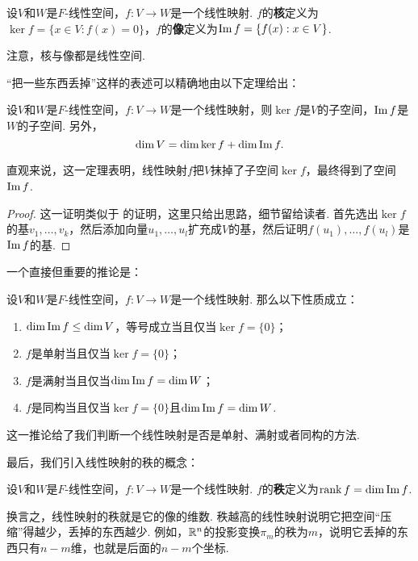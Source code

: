 \begin{definition}[核与像]\label{def:kernel-image}
设$V$和$W$是$F$-线性空间，$f:V\to W$是一个线性映射. $f$的\textbf{核}定义为$\ker f=\{x\in V:f(x)=0\}$，$f$的\textbf{像}定义为$\operatorname*{Im} f=\{f(x):x\in V\}$. 
\end{definition}
注意，核与像都是线性空间. 

“把一些东西丢掉”这样的表述可以精确地由以下定理给出：

\begin{theorem}\label{thm:kernel-image-property}
设$V$和$W$是$F$-线性空间，$f:V\to W$是一个线性映射，则$\ker f$是$V$的子空间，$\operatorname*{Im} f$是$W$的子空间. 另外，
\[\dim V=\dim\ker f+\dim\operatorname*{Im} f.\]
\end{theorem}
直观来说，这一定理表明，线性映射$f$把$V$抹掉了子空间$\ker f$，最终得到了空间$\operatorname*{Im} f$. 
\begin{proof}
这一证明类似于 的证明，这里只给出思路，细节留给读者. 首先选出$\ker f$的基$v_1,\dots,v_k$，然后添加向量$u_1,\dots,u_l$扩充成$V$的基，然后证明$f(u_1),\dots,f(u_l)$是$\operatorname*{Im} f$的基. 
\end{proof}

一个直接但重要的推论是：
\begin{corollary}\label{cor:kernel-image-isomorphism}
设$V$和$W$是$F$-线性空间，$f:V\to W$是一个线性映射. 那么以下性质成立：
\begin{enumerate}
    \item $\dim \operatorname*{Im} f\leq \dim V$，等号成立当且仅当$\ker f=\{0\}$；
    \item $f$是单射当且仅当$\ker f=\{0\}$；
    \item $f$是满射当且仅当$\dim \operatorname*{Im} f=\dim W$；
    \item $f$是同构当且仅当$\ker f=\{0\}$且$\dim \operatorname*{Im} f=\dim W$. 
\end{enumerate}
\end{corollary}
这一推论给了我们判断一个线性映射是否是单射、满射或者同构的方法. 

最后，我们引入线性映射的秩的概念：
\begin{definition}[线性映射的秩]
设$V$和$W$是$F$-线性空间，$f:V\to W$是一个线性映射. $f$的\textbf{秩}定义为$\operatorname*{rank} f=\dim\operatorname*{Im} f$. 
\end{definition}
换言之，线性映射的秩就是它的像的维数. 秩越高的线性映射说明它把空间“压缩”得越少，丢掉的东西越少. 例如，$\mathbb{R}^n$的投影变换$\pi_m$的秩为$m$，说明它丢掉的东西只有$n-m$维，也就是后面的$n-m$个坐标. 

